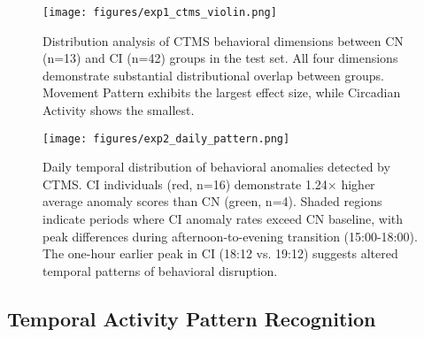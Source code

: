 \documentclass[sigconf, anonymous, 9pt, nonacm]{acmart}
\begin{document}
\begin{figure}[t]
\centering
\texttt{[image: figures/exp1\_ctms\_violin.png]}
\caption{Distribution analysis of CTMS behavioral dimensions between CN (n=13) and CI (n=42) groups in the test set. All four dimensions demonstrate substantial distributional overlap between groups. Movement Pattern exhibits the largest effect size, while Circadian Activity shows the smallest.}
\label{fig:violin_analysis}
\end{figure}

\begin{figure}[t]
\centering
\texttt{[image: figures/exp2\_daily\_pattern.png]}
\caption{Daily temporal distribution of behavioral anomalies detected by CTMS. CI individuals (red, n=16) demonstrate 1.24× higher average anomaly scores than CN (green, n=4). Shaded regions indicate periods where CI anomaly rates exceed CN baseline, with peak differences during afternoon-to-evening transition (15:00-18:00). The one-hour earlier peak in CI (18:12 vs. 19:12) suggests altered temporal patterns of behavioral disruption.}
\label{fig:temporal_patterns}
\vspace{-1.5em}
\end{figure}











\subsection{Temporal Activity Pattern Recognition}\label{subsec:temporal}
\end{document}

